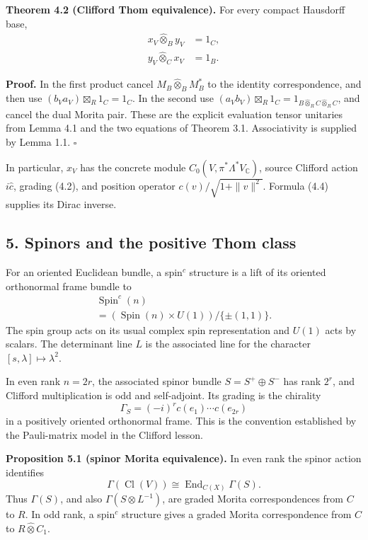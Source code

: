 \documentclass[
  11pt,
]{article}
\begin{document}
\textbf{Theorem 4.2 (Clifford Thom equivalence).} For every compact
Hausdorff base, \[
\begin{aligned}
x_V\widehat\otimes_B y_V&=1_C,\\
y_V\widehat\otimes_C x_V&=1_B.
\end{aligned}
\tag{4.5}
\]

\textbf{Proof.} In the first product cancel
\(M_B\widehat\otimes_BM_B^*\) to the identity correspondence, and then
use \((b_Va_V)\boxtimes_R1_C=1_C\). In the second use
\((a_Vb_V)\boxtimes_R1_C=1_{B\widehat\otimes_R C\widehat\otimes_R C}\),
and cancel the dual Morita pair. These are the explicit evaluation
tensor unitaries from Lemma 4.1 and the two equations of Theorem 3.1.
Associativity is supplied by Lemma 1.1. \(\square\)

In particular, \(x_V\) has the concrete module
\(C_0(V,\pi^*\Lambda^*V_{\mathbb C})\), source Clifford action
\(i\widehat c\), grading (4.2), and position operator
\(c(v)/\sqrt{1+\|v\|^2}\). Formula (4.4) supplies its Dirac inverse.

\subsection{5. Spinors and the positive Thom
class}\label{spinors-and-the-positive-thom-class}

For an oriented Euclidean bundle, a spin\(^{c}\) structure is a lift of
its oriented orthonormal frame bundle to \[
\begin{gathered}
\operatorname{Spin}^{c}(n)\\
 =(\operatorname{Spin}(n)\times U(1))/\{\pm(1,1)\}.
\end{gathered}
\tag{5.1}
\] The spin group acts on its usual complex spin representation and
\(U(1)\) acts by scalars. The determinant line \(L\) is the associated
line for the character \([s,\lambda]\mapsto\lambda^2\).

In even rank \(n=2r\), the associated spinor bundle \(S=S^+\oplus S^-\)
has rank \(2^r\), and Clifford multiplication is odd and self-adjoint.
Its grading is the chirality \[
\Gamma_S=(-i)^r c(e_1)\cdots c(e_{2r})
\tag{5.2}
\] in a positively oriented orthonormal frame. This is the convention
established by the Pauli-matrix model in the Clifford lesson.

\textbf{Proposition 5.1 (spinor Morita equivalence).} In even rank the
spinor action identifies \[
\Gamma(\operatorname{Cl}(V))
 \cong\operatorname{End}_{C(X)}\Gamma(S).
\tag{5.3}
\] Thus \(\Gamma(S)\), and also \(\Gamma(S\otimes L^{-1})\), are graded
Morita correspondences from \(C\) to \(R\). In odd rank, a spin\(^{c}\)
structure gives a graded Morita correspondence from \(C\) to
\(R\widehat\otimes C_1\).
\end{document}
